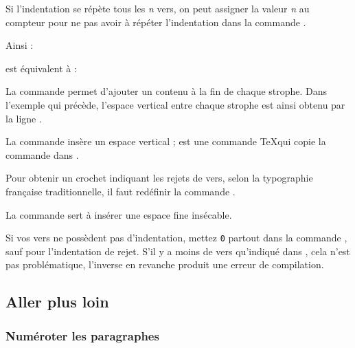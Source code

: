 Si l'indentation se répète tous les \emph{n} vers, on peut assigner la valeur \emph{n} au compteur  pour ne pas avoir à répéter l'indentation dans la commande . 

Ainsi  :
\begin{latexcode}
\setcounter{stanzaindentsrepetition}{2}
\end{latexcode}

est équivalent à :

\begin{latexcode}
\end{latexcode}



La commande  permet d'ajouter un contenu à la fin de chaque strophe.
Dans l'exemple qui précède, l'espace vertical entre chaque  strophe est ainsi obtenu par la ligne 
.
 
La commande  insère un espace vertical ;  est une commande \TeX qui  copie la commande  dans .
\begin{plusloins}
Pour obtenir un crochet indiquant les rejets de vers, selon la typographie française traditionnelle, il faut redéfinir la commande .

\begin{latexcode}
\renewcommand{\hangingsymbol}{[\,}
\end{latexcode}

La commande \csp{,} sert à insérer une espace fine insécable.
\end{plusloins}

Si vos vers ne possèdent pas d'indentation, mettez \verb=0= partout dans la commande , sauf pour l'indentation de rejet. S'il y a moins de vers qu'indiqué dans , cela n'est pas problématique, l'inverse en revanche produit une erreur de compilation.



\subsection{Aller plus loin}

\subsubsection{Numéroter les paragraphes}

